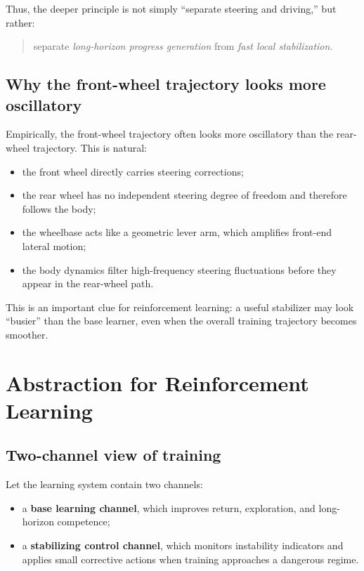 \documentclass[11pt]{article}
\begin{document}
Thus, the deeper principle is not simply ``separate steering and driving,'' but rather:
\begin{quote}
separate \emph{long-horizon progress generation} from \emph{fast local stabilization}.
\end{quote}

\subsection{Why the front-wheel trajectory looks more oscillatory}

Empirically, the front-wheel trajectory often looks more oscillatory than the rear-wheel trajectory. This is natural:
\begin{itemize}[leftmargin=1.5em]
    \item the front wheel directly carries steering corrections;
    \item the rear wheel has no independent steering degree of freedom and therefore follows the body;
    \item the wheelbase acts like a geometric lever arm, which amplifies front-end lateral motion;
    \item the body dynamics filter high-frequency steering fluctuations before they appear in the rear-wheel path.
\end{itemize}

This is an important clue for reinforcement learning: a useful stabilizer may look ``busier'' than the base learner, even when the overall training trajectory becomes smoother.

\section{Abstraction for Reinforcement Learning}

\subsection{Two-channel view of training}

Let the learning system contain two channels:
\begin{itemize}[leftmargin=1.5em]
    \item a \textbf{base learning channel}, which improves return, exploration, and long-horizon competence;
    \item a \textbf{stabilizing control channel}, which monitors instability indicators and applies small corrective actions when training approaches a dangerous regime.
\end{itemize}
\end{document}
